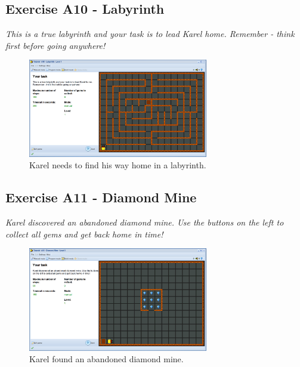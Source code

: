 \documentclass[article,A4,12pt]{llncs}
\begin{document}
\subsection{Exercise A10 - Labyrinth}

{\em This is a true labyrinth and your task is to lead Karel 
home. Remember - think first before going anywhere!}

\begin{figure}[!ht]
\begin{center}
\includegraphics[width=0.7\textwidth]{img/a10.png}
\end{center}
\vspace{-4mm}
\caption{Karel needs to find his way home in a labyrinth.}
\label{fig:a10}
\vspace{-4mm}
\end{figure}
\noindent
\newpage


\subsection{Exercise A11 - Diamond Mine}

{\em Karel discovered an abandoned diamond mine. Use the buttons
on the left to collect all gems and get back home in time!}

\begin{figure}[!ht]
\begin{center}
\includegraphics[width=0.7\textwidth]{img/a11.png}
\end{center}
\vspace{-4mm}
\caption{Karel found an abandoned diamond mine.}
\label{fig:a11}
\vspace{-4mm}
\end{figure}
\noindent
\end{document}
